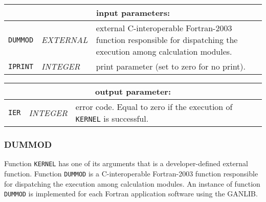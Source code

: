 \vskip 0.8cm

\noindent
\begin{tabular}{|p{1.5cm}|p{3cm}|p{10cm}|}
\hline
\multicolumn{3}{|c|}{\bf input parameters:} \\
\hline
{\tt DUMMOD} & {\it EXTERNAL} & external C-interoperable Fortran-2003 function responsible for dispatching the execution among calculation modules.   \\
\hline
{\tt IPRINT} & {\it INTEGER} & print parameter (set to zero for no print). \\
\hline
\end{tabular}

\vskip 0.4cm
\noindent
\begin{tabular}{|p{1.5cm}|p{3cm}|p{10cm}|}
\hline
\multicolumn{3}{|c|}{\bf output parameter:} \\
\hline
{\tt IER} & {\it INTEGER}  &  error code. Equal to zero if the execution of {\tt KERNEL} is successful.   \\
\hline
\end{tabular}

\subsubsection{DUMMOD}

Function {\tt KERNEL} has one of its arguments that is a developer-defined external function. Function {\tt DUMMOD} is a C-interoperable Fortran-2003 function responsible for dispatching the execution among calculation modules. An instance of function {\tt DUMMOD} is implemented for 
each Fortran application software using the GANLIB.

\vskip 0.08cm

